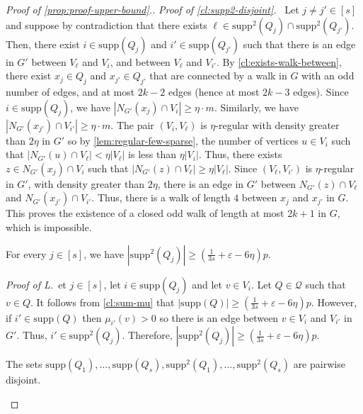 \documentclass{article}
\newcommand{\supp}{\text{supp}}
\newcommand{\mydiamond}{\rotatebox[origin=c]{45}{$\vcenter{\hbox{$\Box$}}$}}
\newenvironment{subproof}[1]{\par\noindent \textit{Proof of #1.}\ }{\hfill \mydiamond \par\vspace{11pt}}
\begin{document}
\begin{proof}[Proof of \cref{prop:proof-upper-bound}.]
    \begin{subproof}{\cref{cl:supp2-disjoint}}
        Let $j \neq j' \in [s]$ and suppose by contradiction that there exists $\ell \in \supp^2(Q_j) \cap \supp^2(Q_{j'})$.
        Then, there exist $i \in \supp(Q_j)$ and $i' \in \supp(Q_{j'})$ such that there is an edge in $G'$ between $V_{\ell}$ and $V_i$, and between $V_{\ell}$ and $V_{i'}$.
        By \cref{cl:exists-walk-between}, there exist $x_j \in Q_j$ and $x_{j'} \in Q_{j'}$ that are connected by a walk in $G$ with an odd number of edges, and at most $2k-2$ edges (hence at most $2k-3$ edges).
        Since $i \in \supp(Q_j)$, we have $|N_{G'}(x_j) \cap V_{i}| \geq \eta \cdot m$.
        Similarly, we have $|N_{G'}(x_{j'}) \cap V_{i'}| \geq \eta \cdot m$.
        The pair $(V_i, V_{\ell})$ is $\eta$-regular with density greater than $2\eta$ in $G'$ so by \cref{lem:regular-few-sparse}, the number of vertices $u \in V_i$ such that $|N_{G'}(u) \cap V_{\ell}| < \eta|V_{\ell}|$ is less than $\eta|V_i|$.
        Thus, there exists $z \in N_{G'}(x_j) \cap V_i$ such that $|N_{G'}(z) \cap V_{\ell}| \geq \eta|V_{\ell}|$.
        Since $(V_{\ell}, V_{i'})$ is $\eta$-regular in $G'$, with density greater than $2\eta$, there is an edge in $G'$ between $N_{G'}(z) \cap V_{\ell}$ and $N_{G'}(x_{j'}) \cap V_{i'}$. 
        Thus, there is a walk of length $4$ between $x_j$ and $x_{j'}$ in $G$.
        This proves the existence of a closed odd walk of length at most $2k+1$ in $G$, which is impossible.
    \end{subproof}

    \begin{claim}\label{cl:size-supp2}
        For every $j \in [s]$, we have $|\supp^2(Q_j)| \geq \left(\frac{1}{3s}+\varepsilon-6\eta\right)p$.
    \end{claim}

    \begin{subproof}
        Let $j \in [s]$, let $i \in \supp(Q_j)$ and let $v \in V_i$.
        Let $Q \in \mathcal{Q}$ such that $v \in Q$.
        It follows from \cref{cl:sum-mu} that $|\supp(Q)| \geq \left(\frac{1}{3s}+\varepsilon-6\eta\right)p$.
        However, if $i' \in \supp(Q)$ then $\mu_{i'}(v) > 0$ so there is an edge between $v \in V_i$ and $V_{i'}$ in $G'$.
        Thus, $i' \in \supp^2(Q_j)$.
        Therefore, $|\supp^2(Q_j)| \geq \left(\frac{1}{3s}+\varepsilon-6\eta\right)p$.
    \end{subproof}

    \begin{claim}\label{cl:all-disjoint}
        The sets $\supp(Q_1), \ldots, \supp(Q_{s}), \supp^2(Q_1), \ldots, \supp^2(Q_{s})$ are pairwise disjoint.
    \end{claim}


\end{proof}
\end{document}
